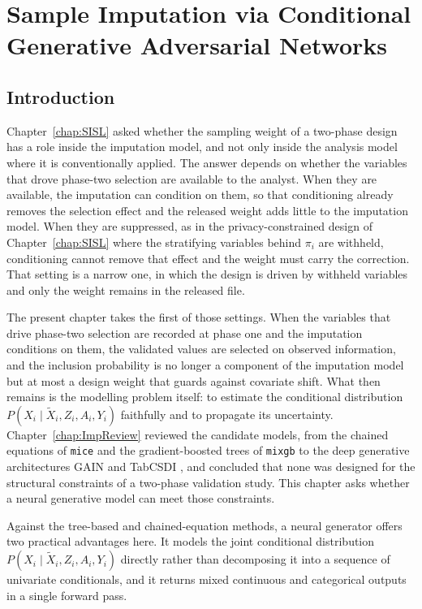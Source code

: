 \chapter{Sample Imputation via Conditional Generative Adversarial Networks}
\label{chap:SICG}

\section{Introduction}
\label{sec:sicg_intro}

Chapter~\ref{chap:SISL} asked whether the sampling weight of a two-phase design has a role inside the imputation model, and not only inside the analysis model where it is conventionally applied. The answer depends on whether the variables that drove phase-two selection are available to the analyst. When they are available, the imputation can condition on them, so that conditioning already removes the selection effect and the released weight adds little to the imputation model. When they are suppressed, as in the privacy-constrained design of Chapter~\ref{chap:SISL} where the stratifying variables behind $\pi_i$ are withheld, conditioning cannot remove that effect and the weight must carry the correction. That setting is a narrow one, in which the design is driven by withheld variables and only the weight remains in the released file.

The present chapter takes the first of those settings. When the variables that drive phase-two selection are recorded at phase one and the imputation conditions on them, the validated values are selected on observed information, and the inclusion probability is no longer a component of the imputation model but at most a design weight that guards against covariate shift. What then remains is the modelling problem itself: to estimate the conditional distribution $P(X_i\mid\tilde{X}_i,Z_i,A_i,Y_i)$ faithfully and to propagate its uncertainty. Chapter~\ref{chap:ImpReview} reviewed the candidate models, from the chained equations of \texttt{mice} \citep{vanBuuren2011} and the gradient-boosted trees of \texttt{mixgb} \citep{deng2024multiple} to the deep generative architectures GAIN \citep{yoon2018gain} and TabCSDI \citep{zheng2022diffusion}, and concluded that none was designed for the structural constraints of a two-phase validation study. This chapter asks whether a neural generative model can meet those constraints.

Against the tree-based and chained-equation methods, a neural generator offers two practical advantages here. It models the joint conditional distribution $P(X_i\mid\tilde{X}_i,Z_i,A_i,Y_i)$ directly rather than decomposing it into a sequence of univariate conditionals, and it returns mixed continuous and categorical outputs in a single forward pass.

